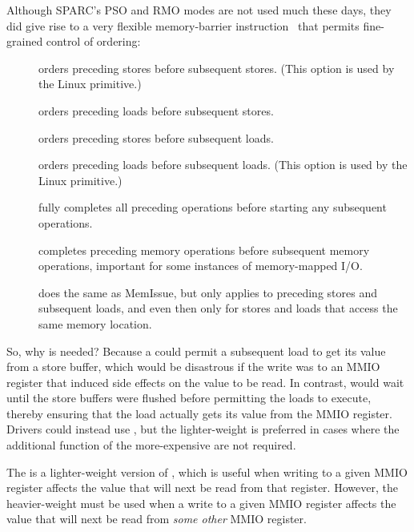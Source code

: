 Although SPARC's PSO and RMO modes are not used much these days, they
did give rise to a very flexible memory-barrier instruction~\cite{SPARC94}
that permits fine-grained control of ordering:
\begin{description}
\item	[] orders preceding stores before subsequent stores.
	(This option is used by the Linux  primitive.)
\item	[] orders preceding loads before subsequent stores.
\item	[] orders preceding stores before subsequent loads.
\item	[] orders preceding loads before subsequent loads.
	(This option is used by the Linux  primitive.)
\item	[] fully completes all preceding operations before starting
	any subsequent operations.
\item	[] completes preceding memory operations before subsequent
	memory operations, important for some instances of memory-mapped
	I/O.
\item	[] does the same as MemIssue,
	but only applies to preceding stores
	and subsequent loads, and even then only for stores and loads that
	access the same memory location.
\end{description}

So, why is  needed?
Because a  could permit a subsequent
load to get its value from a store buffer, which would be
disastrous if the write was to an MMIO register that induced side effects
on the value to be read.
In contrast,  would wait until the store buffers
were flushed before permitting the loads to execute,
thereby ensuring that the load actually gets its value from the MMIO register.
Drivers could instead use , but the lighter-weight
 is preferred in cases where the additional function
of the more-expensive  are not required.

The  is a lighter-weight version of
, which is useful when writing to a given MMIO register
affects the value that will next be read from that register.
However, the heavier-weight  must be used when
a write to a given MMIO register affects the value that will next be
read from {\em some other} MMIO register.

